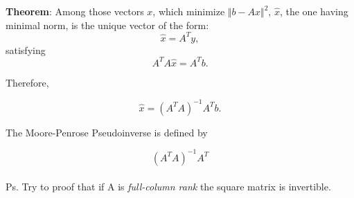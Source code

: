 \documentclass[aspectratio=169]{beamer}
\begin{document}
\begin{comment}

\begin{frame}{}  %
	
	{\color{violet} \textbf{Corollary}:}  $\Vert b - A x \Vert^2$ is minimized by $x_0$ if and only if $A x_0 = \hat{b}$ where $\hat{b}$ is the projection of $b$ on $\mathcal{R}(A)$.
	\vspace*{5mm}
		
	{\color{violet} \textbf{Corollary}:} There is always an $n-$dimensional vector $y$ such that
	\[ \Vert b - A A^T y\Vert^2 = \inf_ x \Vert b - A x \Vert^2,\]
	\noindent and if
	\[ \Vert b - A x_0 \Vert^2 = \inf_ x \Vert b - A x \Vert^2,\]
	\noindent then
	\[ \Vert x_0 \Vert^2 \geq \Vert A^T y\Vert^2\]
	with strict inequality unless $x_0 = A^T y$. The vector y satisfies the equation $A A^T y = \hat{b}$
\end{frame}

\end{comment}
\begin{frame}{} %
	
	{\color{violet} \textbf{Theorem}:} Among those vectors $x$, which minimize $\Vert b - A x\Vert^2$, $\hat{x}$, the one having minimal norm, is the unique vector of the form:
	\[\hat{x}= A^Ty,\]
	\noindent satisfying
	\[ A^T A \hat{x} = A^T b. \]

Therefore, 

\[ 	\hat x = (A^T A )^{-1} A^T b.	\]

The Moore-Penrose Pseudoinverse is defined by

\[ (A^T A )^{-1} A^T \]\\

Ps. Try to proof that if A is \textit{full-column rank} the square matrix is invertible.

\end{frame}
\end{document}
